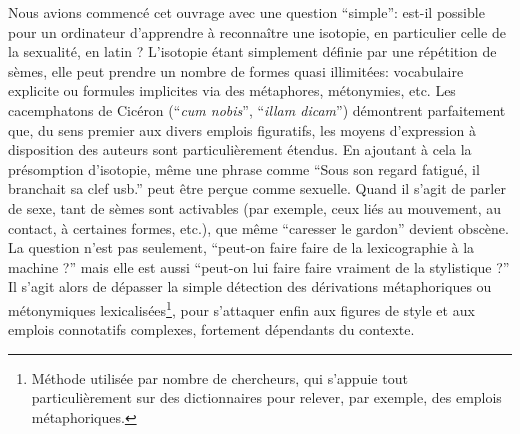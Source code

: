 Nous avions commencé cet ouvrage avec une question \enquote{simple}: est-il possible pour un ordinateur d'apprendre à reconnaître une isotopie, en particulier celle de la sexualité, en latin ? L'isotopie étant simplement définie par une répétition de sèmes, elle peut prendre un nombre de formes quasi illimitées: vocabulaire explicite ou formules implicites via des métaphores, métonymies, etc. Les cacemphatons de Cicéron (\enquote{\textit{cum nobis}}, \enquote{\textit{illam dicam}}) démontrent parfaitement que, du sens premier aux divers emplois figuratifs, les moyens d'expression à disposition des auteurs sont particulièrement étendus. En ajoutant à cela la présomption d'isotopie, même une phrase comme \enquote{Sous son regard fatigué, il branchait sa clef usb.} peut être perçue comme sexuelle. Quand il s'agit de parler de sexe, tant de sèmes sont activables (par exemple, ceux liés au mouvement, au contact, à certaines formes, etc.), que même \enquote{caresser le gardon} devient obscène. La question n'est pas seulement, \enquote{peut-on faire faire de la lexicographie à la machine ?} mais elle est aussi \enquote{peut-on lui faire faire vraiment de la stylistique ?} Il s'agit alors de dépasser la simple détection des dérivations métaphoriques ou métonymiques lexicalisées\footnote{Méthode utilisée par nombre de chercheurs, qui s'appuie tout particulièrement sur des dictionnaires pour relever, par exemple, des emplois métaphoriques.}, pour s'attaquer enfin aux figures de style et aux emplois connotatifs complexes, fortement dépendants du contexte.

